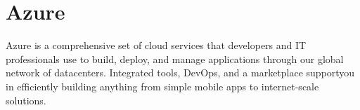 \section{Azure}
Azure\cite{www-azure} is a comprehensive set of cloud services that developers
and IT professionals use to build, deploy, and manage applications through our
global network of datacenters. Integrated tools, DevOps, and a marketplace
supportyou in efficiently building anything from simple mobile apps to
internet-scale solutions.
